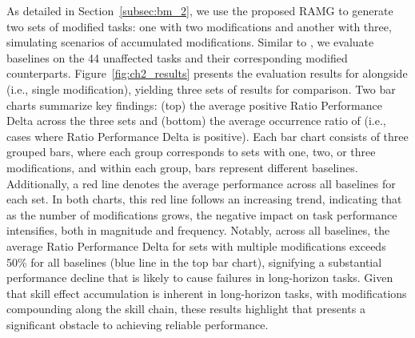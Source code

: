 As detailed in Section~\ref{subsec:bm_2}, we use the proposed RAMG to generate two sets of modified tasks: one with two modifications and another with three, simulating scenarios of accumulated modifications. Similar to \bma, we evaluate baselines on the 44 unaffected tasks and their corresponding modified counterparts. Figure~\ref{fig:ch2_results} presents the evaluation results for \bmb alongside \bma (i.e., single modification), yielding three sets of results for comparison. Two bar charts summarize key findings: (top) the average positive Ratio Performance Delta across the three sets and (bottom) the average occurrence ratio of \pb (i.e., cases where Ratio Performance Delta is positive). Each bar chart consists of three grouped bars, where each group corresponds to sets with one, two, or three modifications, and within each group, bars represent different baselines. Additionally, a red line denotes the average performance across all baselines for each set. In both charts, this red line follows an increasing trend, indicating that as the number of modifications grows, the negative impact on task performance intensifies, both in magnitude and frequency. Notably, across all baselines, the average Ratio Performance Delta for sets with multiple modifications exceeds 50\% for all baselines (blue line in the top bar chart), signifying a substantial performance decline that is likely to cause failures in long-horizon tasks. Given that skill effect accumulation is inherent in long-horizon tasks, with modifications compounding along the skill chain, these results highlight that \pb presents a significant obstacle to achieving reliable performance.






